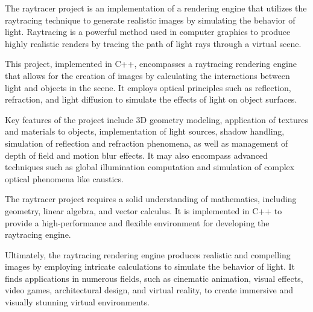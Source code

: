 The raytracer project is an implementation of a rendering engine that utilizes the raytracing technique to generate realistic images by simulating the behavior of light. Raytracing is a powerful method used in computer graphics to produce highly realistic renders by tracing the path of light rays through a virtual scene.

This project, implemented in C++, encompasses a raytracing rendering engine that allows for the creation of images by calculating the interactions between light and objects in the scene. It employs optical principles such as reflection, refraction, and light diffusion to simulate the effects of light on object surfaces.

Key features of the project include 3D geometry modeling, application of textures and materials to objects, implementation of light sources, shadow handling, simulation of reflection and refraction phenomena, as well as management of depth of field and motion blur effects. It may also encompass advanced techniques such as global illumination computation and simulation of complex optical phenomena like caustics.

The raytracer project requires a solid understanding of mathematics, including geometry, linear algebra, and vector calculus. It is implemented in C++ to provide a high-\/performance and flexible environment for developing the raytracing engine.

Ultimately, the raytracing rendering engine produces realistic and compelling images by employing intricate calculations to simulate the behavior of light. It finds applications in numerous fields, such as cinematic animation, visual effects, video games, architectural design, and virtual reality, to create immersive and visually stunning virtual environments. 